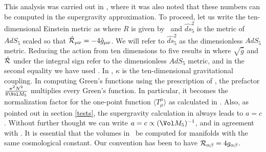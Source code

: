 This analysis was carried out in \cite{Gubser:1999vd}, where it was also
noted that these numbers can be computed in the supergravity
approximation.  To proceed,
let us write the ten-dimensional Einstein metric as
 where $R$ is given by \NLRelation\ and $\widehat{ds}_5^2$ is the metric of
$AdS_5$ scaled so that $\hat{\cal R}_{\mu\nu} = -4 \hat{g}_{\mu\nu}$.  We will
refer to $\widehat{ds}_5^2$ as the dimensionless $AdS_5$ metric.  Reducing
the action from ten dimensions to five results in
 where $\sqrt{\hat{g}}$ and $\hat{\cal R}$ under the integral sign refer to the
dimensionless $AdS_5$ metric, and in the second equality we have used
\NLRelation.  In \FiveActForm, $\kappa$ is the ten-dimensional
gravitational coupling.  In computing Green's functions using the
prescription of \cite{Gubser:1998bc,Witten:1998qj}, the prefactor ${\pi^2
N^2 \over 8 \Vol M_5}$ multiplies every Green's function.  In particular, it
becomes the normalization factor for the one-point function $\langle
T^\mu_\mu \rangle$ as calculated in \cite{Henningson:1998gx}.  Also, as
pointed out in section \ref{tests}, the supergravity calculation in
\cite{Henningson:1998gx} always leads to $a=c$.  Without further thought we
can write $a = c \propto (\Vol M_5)^{-1}$, and
 in agreement with \ChargeRatio.  It is essential that the volumes in
\HenSkenRatio\ be computed for manifolds with the same cosmological
constant.  Our convention has been to have ${\cal R}_{\alpha\beta} =
4g_{\alpha\beta}$.

